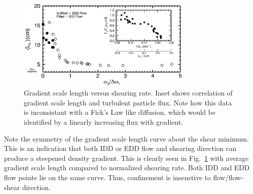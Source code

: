 \documentclass[%
 aps,
 prl,
 amsmath,amssymb,
 reprint,%
]{revtex4-1}
\begin{document}
\begin{figure}
\begin{center}
\includegraphics[width=8.5cm]{shearandgrad.pdf}%
\caption{\label{fig:shearandgrad} Gradient scale length versus shearing rate. Inset shows correlation of gradient scale length and turbulent particle flux. Note how this data is inconsistant with a Fick's Law like diffusion, which would be identified by a linearly increasing flux with gradient.}
\end{center}
\end{figure}

Note the symmetry of the gradient scale length curve about the shear minimum. This is an indication that both IDD or EDD flow and shearing direction can produce a steepened density gradient. This is clearly seen in
Fig.~\ref{fig:shearandgrad}
with average gradient scale length compared to normalized shearing rate. Both IDD and EDD flow points lie on the same curve. Thus, confinement is insenstive to flow/flow-shear direction.
\end{document}
